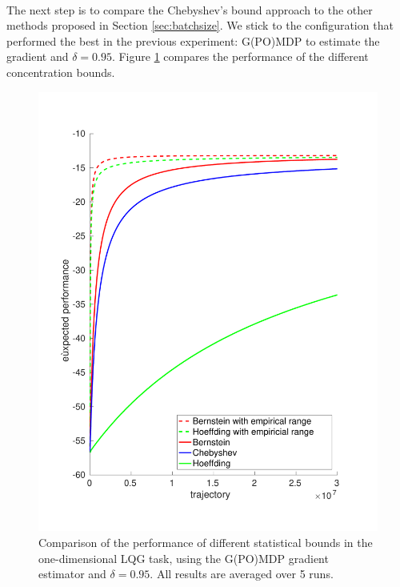 \paragraph{}
The next step is to compare the Chebyshev's bound approach to the other methods proposed in Section \ref{sec:batchsize}. We stick to the configuration that performed the best in the previous experiment: G(PO)MDP to estimate the gradient and $\delta=0.95$. 
Figure \ref{fig:2} compares the performance of the different concentration bounds.

\begin{figure}[h!]
\includegraphics[width = 1.0\textwidth]{Images/compare_bounds.pdf}
\caption[Comparison of the performance of different statistical bounds in the one-dimensional LQG task.]{Comparison of the performance of different statistical bounds in the one-dimensional \ac{LQG} task, using the G(PO)MDP gradient estimator and $\delta=0.95$. All results are averaged over 5 runs.}
\label{fig:2}
\end{figure}

